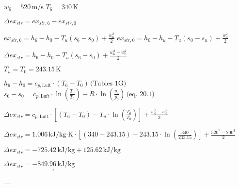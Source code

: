 \( w_6 = 520 \, \text{m/s} \)  
\( T_6 = 340 \, \text{K} \)  

\( \Delta ex_{str} = ex_{str,6} - ex_{str,0} \)  

\( ex_{str,6} = h_6 - h_0 - T_u (s_6 - s_0) + \frac{w_6^2}{2} \)  
\( ex_{str,0} = h_0 - h_u - T_u (s_0 - s_u) + \frac{w_0^2}{2} \)  

\( \Delta ex_{str} = h_6 - h_0 - T_u (s_6 - s_0) + \frac{w_6^2 - w_0^2}{2} \)  

\( T_u = T_0 = 243.15 \, \text{K} \)  

\( h_6 - h_0 = c_{p,\text{Luft}} \cdot (T_6 - T_0) \, \text{(Tables 1G)} \)  
\( s_6 - s_0 = c_{p,\text{Luft}} \cdot \ln \left( \frac{T_6}{T_0} \right) - R \cdot \ln \left( \frac{p_6}{p_0} \right) \, \text{(eq. 20.1)} \)  

\( \Delta ex_{str} = c_{p,\text{Luft}} \cdot \left[ (T_6 - T_0) - T_u \cdot \ln \left( \frac{T_6}{T_0} \right) \right] + \frac{w_6^2 - w_0^2}{2} \)  

\( \Delta ex_{str} = 1.006 \, \text{kJ/kg·K} \cdot \left[ (340 - 243.15) - 243.15 \cdot \ln \left( \frac{340}{243.15} \right) \right] + \frac{520^2 - 200^2}{2} \)  

\( \Delta ex_{str} = -725.42 \, \text{kJ/kg} + 125.62 \, \text{kJ/kg} \)  

\( \Delta ex_{str} = \underline{\underline{-849.96 \, \text{kJ/kg}}} \)  

---